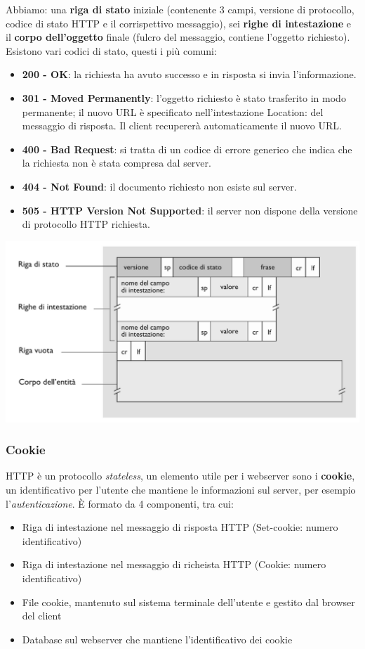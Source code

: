 Abbiamo: una \textbf{riga di stato} iniziale (contenente 3 campi, versione di protocollo, codice di stato HTTP e il corrispettivo messaggio), sei \textbf{righe di intestazione} e il \textbf{corpo dell'oggetto} finale (fulcro del messaggio, contiene l'oggetto richiesto). \newline
Esistono vari codici di stato, questi i più comuni:
\begin{itemize}
  \item \textbf{200 - OK}: la richiesta ha avuto successo e in risposta si invia l’informazione.
  \item \textbf{301 - Moved Permanently}: l’oggetto richiesto è stato trasferito in modo permanente; il nuovo URL è specificato nell’intestazione Location: del messaggio di risposta. Il client recupererà automaticamente il nuovo URL.
  \item \textbf{400 - Bad Request}: si tratta di un codice di errore generico che indica che la richiesta non è stata compresa dal server.
  \item \textbf{404 - Not Found}: il documento richiesto non esiste sul server.
  \item \textbf{505 - HTTP Version Not Supported}: il server non dispone della versione di protocollo HTTP richiesta.
\end{itemize}

\includegraphics[width=\textwidth]{./img/rispostahttp.png}

\subsubsection{Cookie}
HTTP è un protocollo \textit{stateless}, un elemento utile per i webserver sono i \textbf{cookie}, un identificativo per l'utente che mantiene le informazioni sul server, per esempio l'\textit{autenticazione}.
È formato da 4 componenti, tra cui:
\begin{itemize}
  \item Riga di intestazione nel messaggio di risposta HTTP (Set-cookie: numero identificativo)
  \item Riga di intestazione nel messaggio di richeista HTTP (Cookie: numero identificativo)
  \item File cookie, mantenuto sul sistema terminale dell'utente e gestito dal browser del client
  \item Database sul webserver che mantiene l'identificativo dei cookie
\end{itemize}

